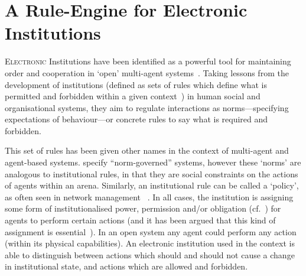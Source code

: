 
\chapter{A Rule-Engine for Electronic Institutions}\label{ch:droolseinst}

\lettrine[lines=3]{E}{lectronic} Institutions have been identified as a powerful
tool for maintaining order and cooperation in `open' multi-agent
systems~\citep{Esteva2001,Artikis2009}. Taking lessons from the development of
institutions (defined as sets of rules which define what is permitted and
forbidden within a given context~\citep{Ostrom1990,North1990}) in human social and
organisational systems, they aim to regulate interactions as norms---specifying
expectations of behaviour---or concrete rules to say what is required and
forbidden.

This set of rules has been given other names in the context of multi-agent and
agent-based systems. \citet{Artikis2009} specify ``norm-governed'' systems,
however these `norms' are analogous to institutional rules, in that they are
social constraints on the actions of agents within an arena. Similarly, an
institutional rule can be called a `policy', as often seen in network
management ~\citep{Sloman1999}. In all cases, the institution is assigning
some form of institutionalised power, permission and/or
obligation (cf.~\citet{Jones1996}) for agents to perform certain actions (and it has
been argued that this kind of assignment is essential~\citep{Artikis2009a}).
In an open system any agent could perform any action (within its physical
capabilities). An electronic institution used in the context is able to
distinguish between actions which should and should not cause a change in
institutional state, and actions which are allowed and forbidden.



